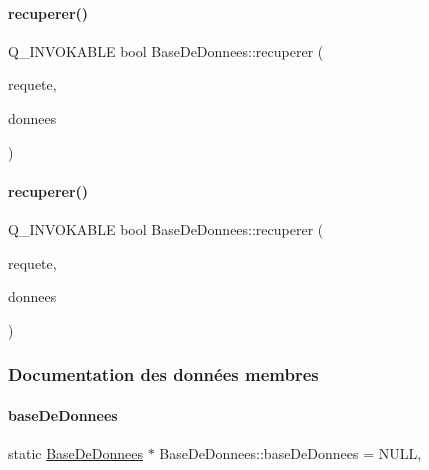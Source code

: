 \mbox{\label{class_base_de_donnees_a2d629c2816246410a15762c487c55a05}} 
\paragraph{\texorpdfstring{recuperer()}{recuperer()}\hspace{0.1cm}{\footnotesize\ttfamily [7/8]}}
{\footnotesize\ttfamily Q\+\_\+\+I\+N\+V\+O\+K\+A\+B\+LE bool Base\+De\+Donnees\+::recuperer (\begin{DoxyParamCaption}\item[{Q\+String}]{requete,  }\item[{Q\+Vector$<$ Q\+String $>$ \&}]{donnees }\end{DoxyParamCaption})}

\mbox{\label{class_base_de_donnees_aa8c509bc3270154b8804765b61d5467d}} 
\paragraph{\texorpdfstring{recuperer()}{recuperer()}\hspace{0.1cm}{\footnotesize\ttfamily [8/8]}}
{\footnotesize\ttfamily Q\+\_\+\+I\+N\+V\+O\+K\+A\+B\+LE bool Base\+De\+Donnees\+::recuperer (\begin{DoxyParamCaption}\item[{Q\+String}]{requete,  }\item[{Q\+Vector$<$ Q\+String\+List $>$ \&}]{donnees }\end{DoxyParamCaption})}



\subsubsection{Documentation des données membres}
\mbox{\label{class_base_de_donnees_a218c44b630523435e2f6f8f2f0c484f8}} 
\paragraph{\texorpdfstring{base\+De\+Donnees}{baseDeDonnees}}
{\footnotesize\ttfamily static \hyperlink{class_base_de_donnees}{Base\+De\+Donnees} $\ast$ Base\+De\+Donnees\+::base\+De\+Donnees = N\+U\+LL\hspace{0.3cm}{\ttfamily [static]}, {\ttfamily [private]}}



